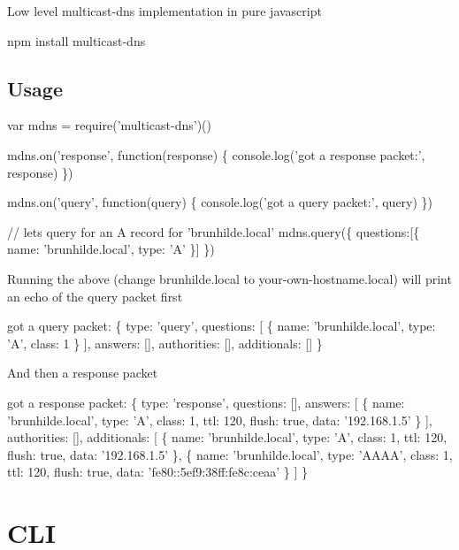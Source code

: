 Low level multicast-\/dns implementation in pure javascript


\begin{DoxyCode}
npm install multicast-dns
\end{DoxyCode}


\href{http://travis-ci.org/mafintosh/multicast-dns}{\tt }

\subsection*{Usage}


\begin{DoxyCode}
var mdns = require('multicast-dns')()

mdns.on('response', function(response) \{
  console.log('got a response packet:', response)
\})

mdns.on('query', function(query) \{
  console.log('got a query packet:', query)
\})

// lets query for an A record for 'brunhilde.local'
mdns.query(\{
  questions:[\{
    name: 'brunhilde.local',
    type: 'A'
  \}]
\})
\end{DoxyCode}


Running the above (change {\ttfamily brunhilde.\+local} to {\ttfamily your-\/own-\/hostname.\+local}) will print an echo of the query packet first


\begin{DoxyCode}
got a query packet: \{ type: 'query',
  questions: [ \{ name: 'brunhilde.local', type: 'A', class: 1 \} ],
  answers: [],
  authorities: [],
  additionals: [] \}
\end{DoxyCode}


And then a response packet


\begin{DoxyCode}
got a response packet: \{ type: 'response',
  questions: [],
  answers:
   [ \{ name: 'brunhilde.local',
       type: 'A',
       class: 1,
       ttl: 120,
       flush: true,
       data: '192.168.1.5' \} ],
  authorities: [],
  additionals:
   [ \{ name: 'brunhilde.local',
       type: 'A',
       class: 1,
       ttl: 120,
       flush: true,
       data: '192.168.1.5' \},
     \{ name: 'brunhilde.local',
       type: 'AAAA',
       class: 1,
       ttl: 120,
       flush: true,
       data: 'fe80::5ef9:38ff:fe8c:ceaa' \} ] \}
\end{DoxyCode}


\section*{C\+LI}


